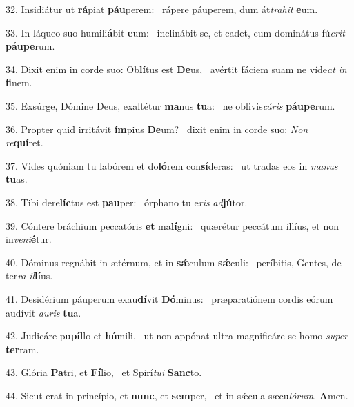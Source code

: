 32. Insidiátur ut \textbf{rá}piat \textbf{páu}perem: \ast\  rápere páuperem, dum át\textit{tra}\textit{hit} \textbf{e}um.\

33. In láqueo suo humili\textbf{á}bit \textbf{e}um: \ast\  inclinábit se, et cadet, cum dominátus fú\textit{e}\textit{rit} \textbf{páu}\textbf{pe}rum.\

34. Dixit enim in corde suo: Ob\textbf{lí}tus est \textbf{De}us, \ast\  avértit fáciem suam ne víde\textit{at} \textit{in} \textbf{fi}nem.\

35. Exsúrge, Dómine Deus, exaltétur \textbf{ma}nus \textbf{tu}a: \ast\  ne oblivis\textit{cá}\textit{ris} \textbf{páu}\textbf{pe}rum.\

36. Propter quid irritávit \textbf{ím}pius \textbf{De}um? \ast\  dixit enim in corde suo: \textit{Non} \textit{re}\textbf{quí}ret.\

37. Vides quóniam tu labórem et do\textbf{ló}rem con\textbf{sí}deras: \ast\  ut tradas eos in \textit{ma}\textit{nus} \textbf{tu}as.\

38. Tibi dere\textbf{líc}tus est \textbf{pau}per: \ast\  órphano tu e\textit{ris} \textit{ad}\textbf{jú}tor.\

39. Cóntere bráchium peccatóris \textbf{et} ma\textbf{lí}gni: \ast\  quærétur peccátum illíus, et non in\textit{ve}\textit{ni}\textbf{é}tur.\

40. Dóminus regnábit in ætérnum, et in \textbf{sǽ}culum \textbf{sǽ}culi: \ast\  períbitis, Gentes, de ter\textit{ra} \textit{il}\textbf{lí}us.\

41. Desidérium páuperum exau\textbf{dí}vit \textbf{Dó}minus: \ast\  præparatiónem cordis eórum audívit \textit{au}\textit{ris} \textbf{tu}a.\

42. Judicáre pu\textbf{píl}lo et \textbf{hú}mili, \ast\  ut non appónat ultra magnificáre se homo \textit{su}\textit{per} \textbf{ter}ram.\

43. Glória \textbf{Pa}tri, et \textbf{Fí}lio, \ast\  et Spirí\textit{tu}\textit{i} \textbf{Sanc}to.\

44. Sicut erat in princípio, et \textbf{nunc}, et \textbf{sem}per, \ast\  et in sǽcula sæcu\textit{ló}\textit{rum}. \textbf{A}men.\

